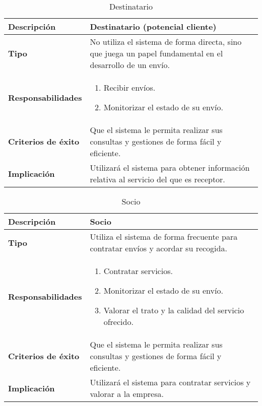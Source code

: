 \documentclass[12pt,spanish]{article}
\begin{document}

\begin{table}[H]
\begin{center}
\begin{tabular}{|l|m{10cm}|}
\hline
\textbf{Descripción} & Destinatario (potencial cliente) \\
\hline
\textbf{Tipo} & No utiliza el sistema de forma directa, sino que juega un papel fundamental en el desarrollo de un envío. \\
\hline
\textbf{Responsabilidades} & 
\begin{minipage}{5in}
    \vskip 1pt
    \begin{enumerate}
   \item Recibir envíos.
   \item Monitorizar el estado de su envío.
   \end{enumerate}
   \vskip 1pt
 \end{minipage}\\ 
\hline
\textbf{Criterios de éxito} & Que el sistema le permita realizar sus consultas y gestiones de forma fácil y eficiente.\\
\hline
\textbf{Implicación} & Utilizará el sistema para obtener información relativa al servicio del que es receptor. \\
\hline
\end{tabular}
\caption{Destinatario}
\end{center}
\end{table}


\begin{table}[H]
\begin{center}
\begin{tabular}{|l|m{10cm}|}
\hline
\textbf{Descripción} & Socio \\
\hline
\textbf{Tipo} & Utiliza el sistema de forma frecuente para contratar envíos y acordar su recogida. \\
\hline
\textbf{Responsabilidades} & 
\begin{minipage}{5in}
    \vskip 1pt
    \begin{enumerate}
   		\item Contratar servicios.
   		\item Monitorizar el estado de su envío.
     	\item Valorar el trato y la calidad del servicio ofrecido.
   \end{enumerate}
   \vskip 1pt
 \end{minipage}\\ 
\hline
\textbf{Criterios de éxito} & Que el sistema le permita realizar sus consultas y gestiones de forma fácil y eficiente.\\
\hline
\textbf{Implicación} & Utilizará el sistema para contratar servicios y valorar a la empresa. \\
\hline
\end{tabular}
\caption{Socio}
\end{center}
\end{table}
\end{document}
